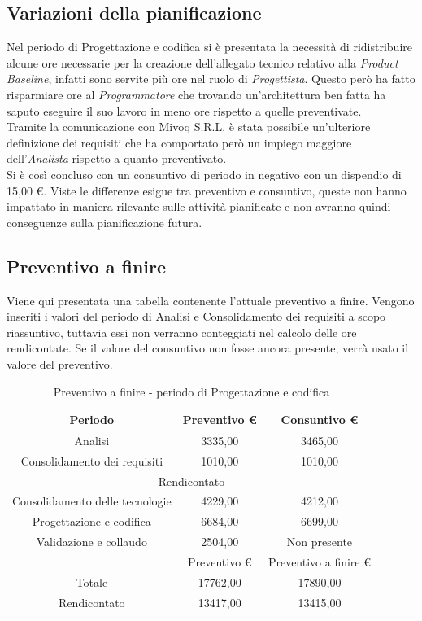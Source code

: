 \documentclass[./PianodiProgetto.tex]{subfiles}
\begin{document}
\subsection{Variazioni della pianificazione}
Nel periodo di Progettazione e codifica si è presentata la necessità di ridistribuire alcune ore necessarie per la creazione dell'allegato tecnico relativo alla \textit{Product Baseline}, infatti sono servite più ore nel ruolo di \textit{Progettista}. Questo però ha fatto risparmiare ore al \textit{Programmatore} che trovando un'architettura ben fatta ha saputo eseguire il suo lavoro in meno ore rispetto a quelle preventivate. \\
Tramite la comunicazione con Mivoq S.R.L. è stata possibile un'ulteriore definizione dei requisiti che ha comportato però un impiego maggiore dell'\textit{Analista} rispetto a quanto preventivato. \\
Si è così concluso con un consuntivo di periodo in negativo con un dispendio di 15,00 \euro{}. Viste le differenze esigue tra preventivo e consuntivo, queste non hanno impattato in maniera rilevante sulle attività pianificate e non avranno quindi conseguenze sulla pianificazione futura.

\subsection{Preventivo a finire}
Viene qui presentata una tabella contenente l'attuale preventivo a finire.
Vengono inseriti i valori del periodo di Analisi e Consolidamento dei requisiti a scopo riassuntivo, tuttavia essi non verranno conteggiati nel calcolo delle ore rendicontate. Se il valore del consuntivo non fosse ancora presente, verrà usato il valore del preventivo.

\begin{table}[H]
	\centering
	\begin{tabular}{|c|c|c|}
		\hline
		Periodo&Preventivo \euro{}&Consuntivo \euro{} \\ \hline
		Analisi&3335,00&3465,00  \\ \hline
		Consolidamento dei requisiti&1010,00&1010,00  \\ \hline
		\multicolumn{3}{|c|}{Rendicontato}  \\ \hline
		Consolidamento delle tecnologie&4229,00&4212,00  \\ \hline
		Progettazione e codifica&6684,00&6699,00  \\ \hline
		Validazione e collaudo&2504,00&Non presente  \\ \hline
		&Preventivo \euro{}&Preventivo a finire \euro{}  \\ \hline
		Totale&17762,00&17890,00 \\ \hline
		Rendicontato&13417,00&13415,00 \\ \hline
	\end{tabular}
	\caption{Preventivo a finire - periodo di Progettazione e codifica}
\end{table}
\end{document}
